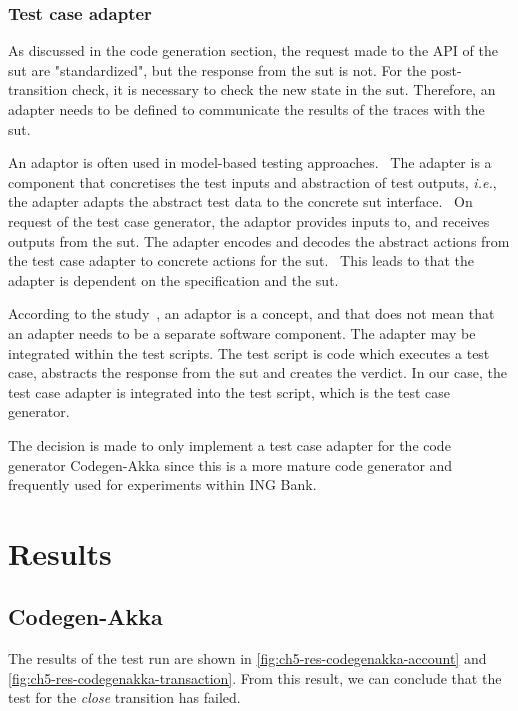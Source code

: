 \subsubsection{Test case adapter}\label{sec:ch5-adapter}
As discussed in the code generation section, the request made to the API of the
\gls{sut} are "standardized", but the response from the \gls{sut} is not. For the
post-transition check, it is necessary to check the new state in the \gls{sut}.
Therefore, an adapter needs to be defined to communicate the results of the
traces with the \gls{sut}.

An adaptor is often used in model-based testing
approaches.~\cite{utting2012taxonomy, tretmans2003torx}
The adapter is a component that concretises the test inputs and abstraction of
test outputs, \textit{i.e.}, the adapter adapts the abstract test data to the
concrete \gls{sut} interface.~\cite[p.~4]{utting2012taxonomy}
On request of the test case generator, the adaptor provides inputs to, and
receives outputs from the \gls{sut}. The adapter encodes and decodes the
abstract actions from the test case adapter to concrete actions for the
\gls{sut}.~\cite[p.~5]{tretmans2003torx} This leads to that the adapter is
dependent on the specification and the \gls{sut}.

According to the study~\cite[p.~4]{utting2012taxonomy}, an adaptor is a concept,
and that does not mean that an adapter needs to be a separate software component.
The adapter may be integrated within the test scripts. The test script is code
which executes a test case, abstracts the response from the \gls{sut} and
creates the verdict. In our case, the test case adapter is integrated into the
test script, which is the test case generator.

The decision is made to only implement a test case adapter for the code generator
Codegen-Akka since this is a more mature code generator and frequently used for
experiments within ING Bank.

\section{Results}\label{sec:ch5-results}

\subsection{Codegen-Akka}\label{sec:ch5-run-codegenakka}

The results of the test run are shown in
\autoref{fig:ch5-res-codegenakka-account} and
\autoref{fig:ch5-res-codegenakka-transaction}. From this result, we can conclude
that the test for the \textit{close} transition has failed.

